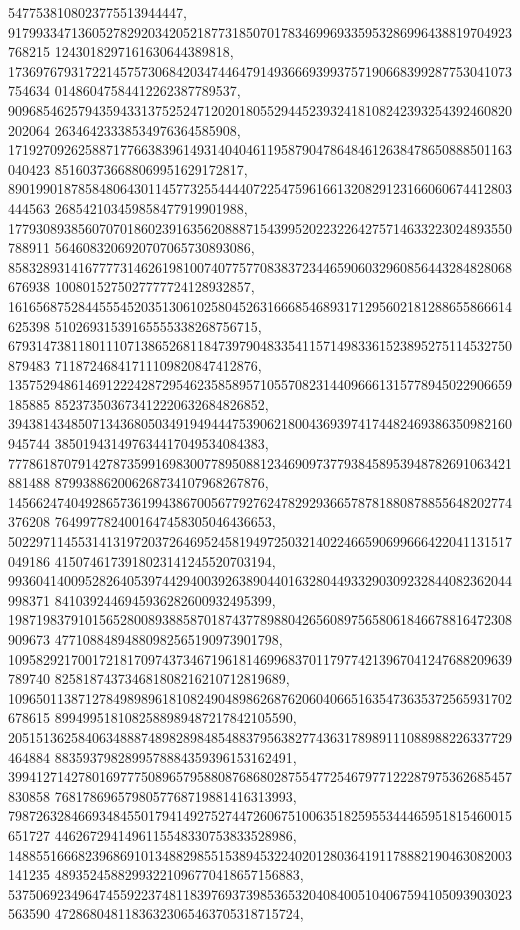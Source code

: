 \documentclass[12pt]{article}
\begin{document}
5477538108023775513944447, 
917993347136052782920342052187731850701783469969335953286996438819704923768215
1243018297161630644389818, 
173697679317221457573068420347446479149366693993757190668399287753041073754634
01486047584412262387789537, 
909685462579435943313752524712020180552944523932418108242393254392460820202064
26346423338534976364585908, 
171927092625887177663839614931404046119587904786484612638478650888501163040423
851603736688069951629172817, 
890199018785848064301145773255444407225475961661320829123166060674412803444563
268542103459858477919901988, 
177930893856070701860239163562088871543995202232264275714633223024893550788911
5646083206920707065730893086, 
858328931416777731462619810074077577083837234465906032960856443284828068676938
1008015275027777724128932857, 
161656875284455545203513061025804526316668546893171295602181288655866614625398
51026931539165555338268756715, 
679314738118011107138652681184739790483354115714983361523895275114532750879483
71187246841711109820847412876, 
135752948614691222428729546235858957105570823144096661315778945022906659185885
852373503673412220632684826852, 
394381434850713436805034919494447539062180043693974174482469386350982160945744
385019431497634417049534084383, 
777861870791427873599169830077895088123469097377938458953948782691063421881488
879938862006268734107968267876, 
145662474049286573619943867005677927624782929366578781880878855648202774376208
7649977824001647458305046436653, 
502297114553141319720372646952458194972503214022466590699666422041131517049186
4150746173918023141245520703194, 
993604140095282640539744294003926389044016328044933290309232844082362044998371
8410392446945936282600932495399, 
198719837910156528008938858701874377898804265608975658061846678816472308909673
47710884894880982565190973901798, 
109582921700172181709743734671961814699683701179774213967041247688209639789740
825818743734681808216210712819689, 
109650113871278498989618108249048986268762060406651635473635372565931702678615
8994995181082588989487217842105590, 
205151362584063488874898289848548837956382774363178989111088988226337729464884
8835937982899578884359396153162491, 
399412714278016977750896579588087686802875547725467977122287975362685457830858
7681786965798057768719881416313993, 
798726328466934845501794149275274472606751006351825955344465951815460015651727
4462672941496115548330753833528986, 
148855166682396869101348829855153894532240201280364191178882190463082003141235
48935245882993221096770418657156883, 
537506923496474559223748118397693739853653204084005104067594105093903023563590
47286804811836323065463705318715724, 
\end{document}

